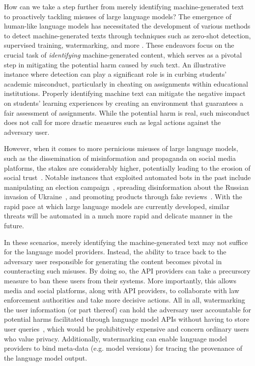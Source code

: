  How can we take a step further from merely identifying machine-generated text to proactively tackling misuses of large language models? The emergence of human-like language models has necessitated the development of various methods to detect machine-generated texts through techniques such as zero-shot detection, supervised training, watermarking, and more \citep{mitchell2023detectgpt, wang2023m4, kirchenbauer2023watermark, krishna2023paraphrasing}. 
These endeavors focus on the crucial task of \textit{identifying} machine-generated content, which serves as a pivotal step in mitigating the potential harm caused by such text. An illustrative instance where detection can play a significant role is in curbing students' academic misconduct, particularly in cheating on assignments within educational institutions. Properly identifying machine text can mitigate the negative impact on students' learning experiences by creating an environment that guarantees a fair assessment of assignments. While the potential harm is real, such misconduct does not call for more drastic measures such as legal actions against the adversary user. 


However, when it comes to more pernicious misuses of large language models, such as the dissemination of misinformation and propaganda on social media platforms, the stakes are considerably higher, potentially leading to the erosion of social trust~\citep{valenzuela2022downward}. 
Notable instances that exploited automated bots in the past include manipulating an election campaign~\citep{Badway2018}, spreading disinformation about the Russian invasion of Ukraine~\citep{pierri2023propaganda}, and promoting products through fake reviews~\citep{amazon-reviews}. With the rapid pace at which large language models are currently developed, similar threats will be automated in a much more rapid and delicate manner in the future. 

In these scenarios, merely identifying the machine-generated text may not suffice for the language model providers. Instead, the ability to trace back to the adversary user responsible for generating the content becomes pivotal in counteracting such misuses. By doing so, the API providers can take a precursory measure to ban these users from their systems. More importantly, this allows media and social platforms, along with API providers, to collaborate with law enforcement authorities and take more decisive actions. All in all,  watermarking the user information (or part thereof) can hold the adversary user accountable for potential harms facilitated through language model APIs without having to store user queries~\citep{krishna2023paraphrasing}, which would be prohibitively expensive and concern ordinary users who value privacy. Additionally, watermarking can enable language model providers to bind meta-data (e.g. model versions) for tracing the provenance of the language model output.



